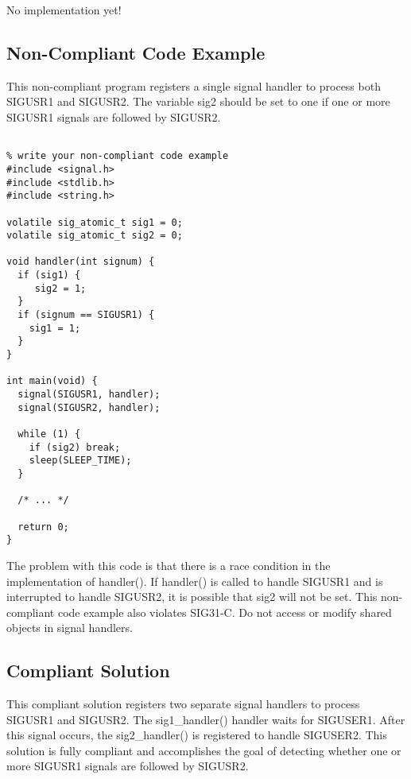    No implementation yet!

\subsection{Non-Compliant Code Example}

This non-compliant program registers a single signal handler to process both
SIGUSR1 and SIGUSR2. The variable sig2 should be set to one if one or more
SIGUSR1 signals are followed by SIGUSR2.

\begin{verbatim}

% write your non-compliant code example
#include <signal.h>
#include <stdlib.h>
#include <string.h>

volatile sig_atomic_t sig1 = 0;
volatile sig_atomic_t sig2 = 0;

void handler(int signum) {
  if (sig1) {
     sig2 = 1;
  }
  if (signum == SIGUSR1) {
    sig1 = 1;
  }
}

int main(void) {
  signal(SIGUSR1, handler);
  signal(SIGUSR2, handler);

  while (1) {
    if (sig2) break;
    sleep(SLEEP_TIME);
  }

  /* ... */

  return 0;
}

\end{verbatim}

The problem with this code is that there is a race condition in the
implementation of handler(). If handler() is called to handle SIGUSR1 and is
interrupted to handle SIGUSR2, it is possible that sig2 will not be set. This
non-compliant code example also violates SIG31-C. Do not access or modify shared
objects in signal handlers.

\subsection{Compliant Solution}

This compliant solution registers two separate signal handlers to process
SIGUSR1 and SIGUSR2. The sig1\_handler() handler waits for SIGUSER1. After this
signal occurs, the sig2\_handler() is registered to handle SIGUSER2. This
solution is fully compliant and accomplishes the goal of detecting whether one
or more SIGUSR1 signals are followed by SIGUSR2.

